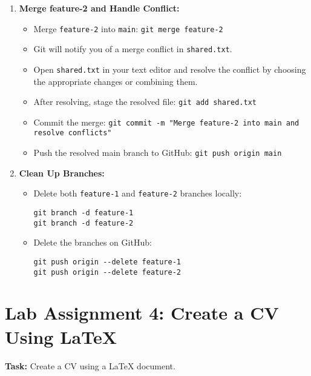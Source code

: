 \documentclass[a4paper,12pt]{article}
\begin{document}
\begin{enumerate}[label=\arabic*.]
    \item \textbf{Merge feature-2 and Handle Conflict:}
    \begin{itemize}
        \item Merge \texttt{feature-2} into \texttt{main}: \texttt{git merge feature-2}
        \item Git will notify you of a merge conflict in \texttt{shared.txt}.
        \item Open \texttt{shared.txt} in your text editor and resolve the conflict by choosing the appropriate changes or combining them.
        \item After resolving, stage the resolved file: \texttt{git add shared.txt}
        \item Commit the merge: \texttt{git commit -m "Merge feature-2 into main and resolve conflicts"}
        \item Push the resolved main branch to GitHub: \texttt{git push origin main}
    \end{itemize}

    \item \textbf{Clean Up Branches:}
    \begin{itemize}
        \item Delete both \texttt{feature-1} and \texttt{feature-2} branches locally:
        \begin{verbatim}
git branch -d feature-1
git branch -d feature-2
        \end{verbatim}
        \item Delete the branches on GitHub:
        \begin{verbatim}
git push origin --delete feature-1
git push origin --delete feature-2
        \end{verbatim}
    \end{itemize}
\end{enumerate}

\section{Lab Assignment 4: Create a CV Using LaTeX}

\textbf{Task:} Create a CV using a LaTeX document.
\end{document}
